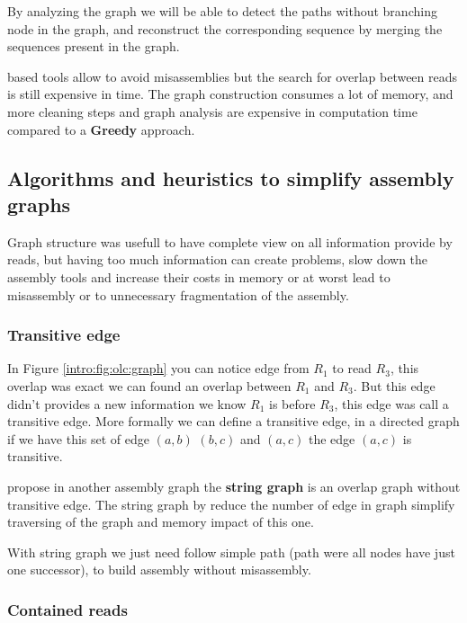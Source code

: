 \documentclass[main]{subfiles}
\begin{document}
By analyzing the graph we will be able to detect the paths without branching node in the graph, and reconstruct the corresponding sequence by merging the sequences present in the graph.

\OLC based tools allow to avoid misassemblies but the search for overlap between reads is still expensive in time. The graph construction consumes a lot of memory, and more cleaning steps and graph analysis are expensive in computation time compared to a \textbf{Greedy} approach. 



\subsection{Algorithms and heuristics to simplify assembly graphs}

Graph structure was usefull to have complete view on all information provide by reads, but having too much information can create problems, slow down the assembly tools and increase their costs in memory or at worst lead to misassembly or to unnecessary fragmentation of the assembly.

\subsubsection{Transitive edge}  \label{intro:subsubsec:transitive_edge}

In Figure \ref{intro:fig:olc:graph} you can notice edge from $R_1$ to read $R_3$, this overlap was exact we can found an overlap between $R_1$ and $R_3$. But this edge didn't provides a new information we know $R_1$ is before $R_3$, this edge was call a transitive edge. More formally we can define a transitive edge, in a directed graph if we have this set of edge $(a, b)$ $(b, c)$ and $(a, c)$ the edge $(a, c)$ is transitive.

\citeauthor{string_graph} propose in \cite{string_graph} another assembly graph the \textbf{string graph} is an overlap graph without transitive edge. The string graph by reduce the number of edge in graph simplify traversing of the graph and memory impact of this one.

With string graph we just need follow simple path (path were all nodes have just one successor), to build assembly without misassembly.

\subsubsection{Contained reads} \label{intro:subsubsec:contained_reads}
\end{document}
